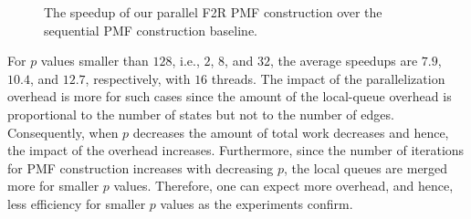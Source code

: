 \documentclass[12pt]{article}
\begin{document}
\begin{figure}[ht]
	\centering
	\caption{The speedup of our parallel F2R PMF construction over the sequential PMF construction baseline.}
	\label{fig:f2r-speedup}
\end{figure}

For $p$ values smaller than $128$, i.e., $2$, $8$, and $32$, the average speedups are $7.9$, $10.4$,  and $12.7$, respectively, with $16$ threads. The impact of the parallelization overhead is more for such cases since the amount of the local-queue overhead is proportional to the number of states but not to the number of edges. Consequently, when $p$ decreases the amount of total work decreases and hence, the impact of the overhead increases. Furthermore, since the number of iterations for PMF construction increases with decreasing $p$, the local queues are merged more for smaller $p$ values. Therefore, one can expect more overhead, and hence, less efficiency for smaller $p$ values as the experiments confirm.
\end{document}
